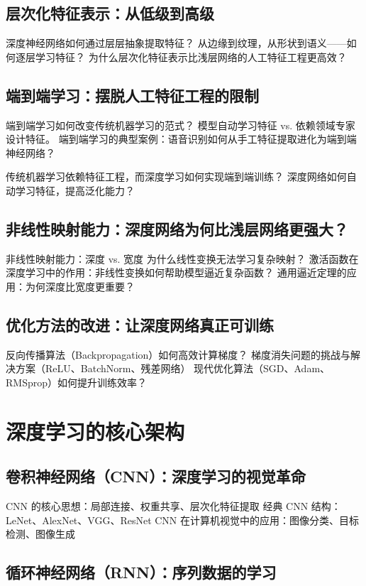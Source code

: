 \subsection{层次化特征表示：从低级到高级}
深度神经网络如何通过层层抽象提取特征？
从边缘到纹理，从形状到语义——如何逐层学习特征？
为什么层次化特征表示比浅层网络的人工特征工程更高效？

\subsection{端到端学习：摆脱人工特征工程的限制}
端到端学习如何改变传统机器学习的范式？
模型自动学习特征 vs. 依赖领域专家设计特征。
端到端学习的典型案例：语音识别如何从手工特征提取进化为端到端神经网络？

传统机器学习依赖特征工程，而深度学习如何实现端到端训练？
深度网络如何自动学习特征，提高泛化能力？

\subsection{非线性映射能力：深度网络为何比浅层网络更强大？}
非线性映射能力：深度 vs. 宽度
为什么线性变换无法学习复杂映射？
激活函数在深度学习中的作用：非线性变换如何帮助模型逼近复杂函数？
通用逼近定理的应用：为何深度比宽度更重要？


\subsection{优化方法的改进：让深度网络真正可训练}

反向传播算法（Backpropagation）如何高效计算梯度？
梯度消失问题的挑战与解决方案（ReLU、BatchNorm、残差网络）
现代优化算法（SGD、Adam、RMSprop）如何提升训练效率？

\section{深度学习的核心架构}
\subsection{卷积神经网络（CNN）：深度学习的视觉革命}

CNN 的核心思想：局部连接、权重共享、层次化特征提取
经典 CNN 结构：LeNet、AlexNet、VGG、ResNet
CNN 在计算机视觉中的应用：图像分类、目标检测、图像生成
\subsection{循环神经网络（RNN）：序列数据的学习}

